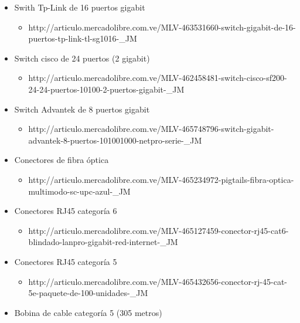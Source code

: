 \documentclass[]{article}
\begin{document}
\begin{itemize}
\itemsep1pt\parskip0pt
\item
  Swith Tp-Link de 16 puertos gigabit

  \begin{itemize}
  \itemsep1pt\parskip0pt
  \item
    http://articulo.mercadolibre.com.ve/MLV-463531660-switch-gigabit-de-16-puertos-tp-link-tl-sg1016-\_JM
  \end{itemize}
\item
  Switch cisco de 24 puertos (2 gigabit)

  \begin{itemize}
  \itemsep1pt\parskip0pt
  \item
    http://articulo.mercadolibre.com.ve/MLV-462458481-switch-cisco-sf200-24-24-puertos-10100-2-puertos-gigabit-\_JM
  \end{itemize}
\item
  Switch Advantek de 8 puertos gigabit

  \begin{itemize}
  \itemsep1pt\parskip0pt
  \item
    http://articulo.mercadolibre.com.ve/MLV-465748796-switch-gigabit-advantek-8-puertos-101001000-netpro-serie-\_JM
  \end{itemize}
\item
  Conectores de fibra óptica

  \begin{itemize}
  \itemsep1pt\parskip0pt
  \item
    http://articulo.mercadolibre.com.ve/MLV-465234972-pigtails-fibra-optica-multimodo-sc-upc-azul-\_JM
  \end{itemize}
\item
  Conectores RJ45 categoría 6

  \begin{itemize}
  \itemsep1pt\parskip0pt
  \item
    http://articulo.mercadolibre.com.ve/MLV-465127459-conector-rj45-cat6-blindado-lanpro-gigabit-red-internet-\_JM
  \end{itemize}
\item
  Conectores RJ45 categoría 5

  \begin{itemize}
  \itemsep1pt\parskip0pt
  \item
    http://articulo.mercadolibre.com.ve/MLV-465432656-conector-rj-45-cat-5e-paquete-de-100-unidades-\_JM
  \end{itemize}
\item
  Bobina de cable categoría 5 (305 metros)


\end{itemize}
\end{document}
